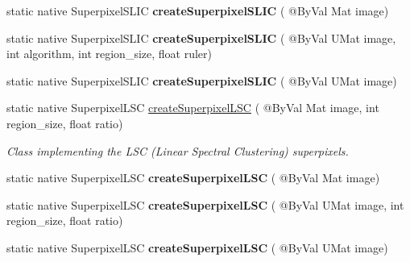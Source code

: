 \begin{DoxyCompactItemize}
\item 
static native Superpixel\+S\+L\+IC {\bfseries create\+Superpixel\+S\+L\+IC} ( @By\+Val Mat image)
\item 
static native Superpixel\+S\+L\+IC {\bfseries create\+Superpixel\+S\+L\+IC} ( @By\+Val U\+Mat image, int algorithm, int region\+\_\+size, float ruler)
\item 
static native Superpixel\+S\+L\+IC {\bfseries create\+Superpixel\+S\+L\+IC} ( @By\+Val U\+Mat image)
\item 
static native Superpixel\+L\+SC \hyperlink{group__ximgproc__superpixel_ga8bf6750a423a7f806993324e9b1a2276}{create\+Superpixel\+L\+SC} ( @By\+Val Mat image, int region\+\_\+size, float ratio)
\begin{DoxyCompactList}\small\item\em Class implementing the L\+SC (Linear Spectral Clustering) superpixels. \end{DoxyCompactList}\item 
static native Superpixel\+L\+SC {\bfseries create\+Superpixel\+L\+SC} ( @By\+Val Mat image)
\item 
static native Superpixel\+L\+SC {\bfseries create\+Superpixel\+L\+SC} ( @By\+Val U\+Mat image, int region\+\_\+size, float ratio)
\item 
static native Superpixel\+L\+SC {\bfseries create\+Superpixel\+L\+SC} ( @By\+Val U\+Mat image)
\end{DoxyCompactItemize}
